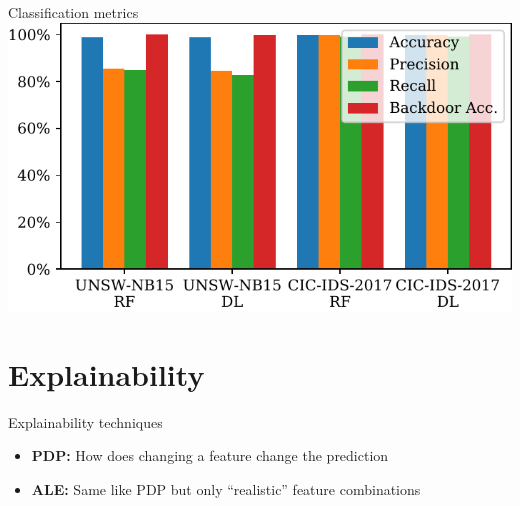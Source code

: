 \documentclass[xcolor={dvipsnames}]{beamer}
\begin{document}
\begin{frame}{Classification metrics}
\centering
\includegraphics[width=1.05\columnwidth]{figures/bar_plot_metrics}
\end{frame}

\section{Explainability}
\begin{frame}{Explainability techniques}
\begin{itemize}
\item \textbf{PDP:} How does changing a feature change the prediction
\item \textbf{ALE:} Same like PDP but only ``realistic'' feature combinations
\end{itemize}
\end{frame}
\end{document}
